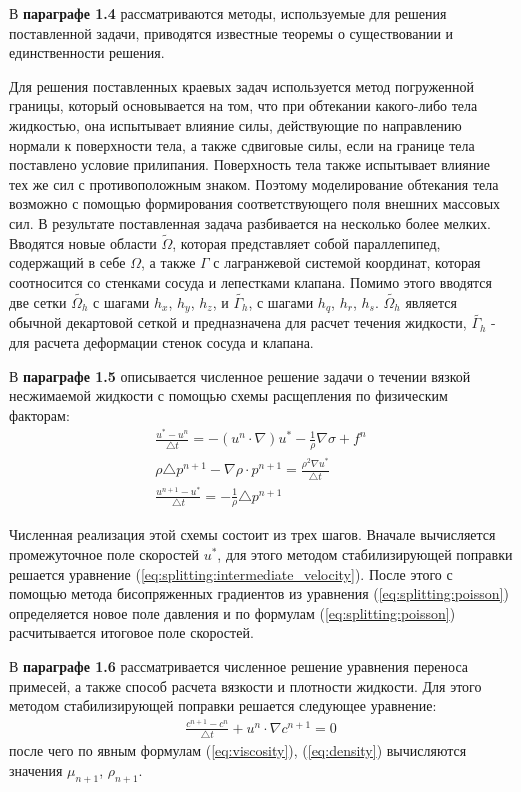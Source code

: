 В \textbf{параграфе 1.4} рассматриваются методы, используемые для решения
поставленной задачи, приводятся известные теоремы о существовании и
единственности решения.

Для решения поставленных краевых задач используется метод погруженной границы,
который основывается на том, что при обтекании какого-либо тела жидкостью, она
испытывает влияние силы, действующие по направлению нормали к поверхности тела,
а также сдвиговые силы, если на границе тела поставлено условие прилипания.
Поверхность тела также испытывает влияние тех же сил с противоположным знаком.
Поэтому моделирование обтекания тела возможно с помощью формирования
соответствующего поля внешних массовых сил.  В результате поставленная задача
разбивается на несколько более мелких. Вводятся новые области $\tilde{\Omega}$,
которая представляет собой параллепипед, содержащий в себе $\Omega$, а также
$\Gamma$ с лагранжевой системой координат, которая соотносится со стенками
сосуда и лепестками клапана.  Помимо этого вводятся две сетки
$\tilde{\Omega_h}$ с шагами $h_x$, $h_y$, $h_z$, и $\tilde{\Gamma_h}$, с шагами
$h_q$, $h_r$, $h_s$. $\tilde{\Omega_h}$ является обычной декартовой сеткой и
предназначена для расчет течения жидкости, $\tilde{\Gamma_h}$ - для расчета
деформации стенок сосуда и клапана.

В \textbf{параграфе 1.5} описывается численное решение задачи о течении вязкой
несжимаемой жидкости с помощью схемы расщепления по физическим факторам:
\begin{gather}
    \label{eq:splitting:intermediate_velocity}
    \frac{u^* - u^n}{\triangle t} = - (u^n \cdot \nabla) u^* - \frac{1}{\rho} \nabla \sigma + f^n\\
    \label{eq:splitting:poisson}
    \rho \triangle p^{n+1} - \nabla \rho \cdot p^{n+1} = \frac{\rho^2 \nabla u^*}{\triangle t}\\
    \label{eq:splitting:velocity}
    \frac{u^{n+1} - u^*}{\triangle t} = - \frac{1}{\rho} \triangle p^{n+1}
\end{gather}

Численная реализация этой схемы состоит из трех шагов. Вначале вычисляется
промежуточное поле скоростей $u^{*}$, для этого методом стабилизирующей
поправки решается уравнение (\ref{eq:splitting:intermediate_velocity}).  После
этого с помощью метода бисопряженных градиентов из уравнения
(\ref{eq:splitting:poisson}) определяется новое поле давления и по формулам
(\ref{eq:splitting:poisson}) расчитывается итоговое поле скоростей.

В \textbf{параграфе 1.6} рассматривается численное решение уравнения переноса
примесей, а также способ расчета вязкости и плотности жидкости.  Для этого
методом стабилизирующей поправки решается следующее уравнение:
\begin{gather}
    \label{eq:numerical_concentration}
    \frac{c^{n+1} - c^{n}}{\triangle t} + u^{n} \cdot \nabla c^{n+1} = 0
\end{gather}
после чего по явным формулам (\ref{eq:viscosity}), (\ref{eq:density})
вычисляются значения $\mu_{n+1}$, $\rho_{n+1}$.

